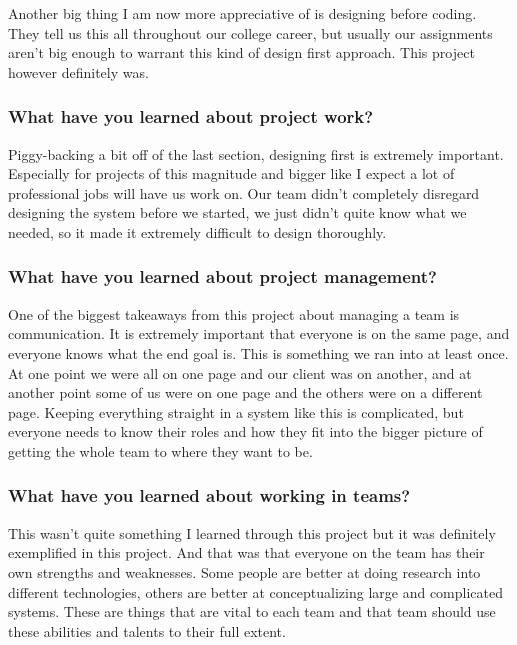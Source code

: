 \documentclass[letterpaper,10pt,titlepage,draftclsnofoot,onecolumn,onesided] {IEEEtran}
\begin{document}
Another big thing I am now more appreciative of is designing before coding.
They tell us this all throughout our college career, but usually our assignments aren't big enough to warrant this kind of design first approach.
This project however definitely was.\\

\subsubsection{What have you learned about project work?}
Piggy-backing a bit off of the last section, designing first is extremely important.
Especially for projects of this magnitude and bigger like I expect a lot of professional jobs will have us work on.
Our team didn't completely disregard designing the system before we started, we just didn't quite know what we needed, so it made it extremely difficult to design thoroughly. \\

\subsubsection{What have you learned about project management?}
One of the biggest takeaways from this project about managing a team is communication.
It is extremely important that everyone is on the same page, and everyone knows what the end goal is.
This is something we ran into at least once.
At one point we were all on one page and our client was on another, and at another point some of us were on one page and the others were on a different page.
Keeping everything straight in a system like this is complicated, but everyone needs to know their roles and how they fit into the bigger picture of getting the whole team to where they want to be.\\

\subsubsection{What have you learned about working in teams?}
This wasn't quite something I learned through this project but it was definitely exemplified in this project.
And that was that everyone on the team has their own strengths and weaknesses.
Some people are better at doing research into different technologies, others are better at conceptualizing large and complicated systems.
These are things that are vital to each team and that team should use these abilities and talents to their full extent. \\
\end{document}
